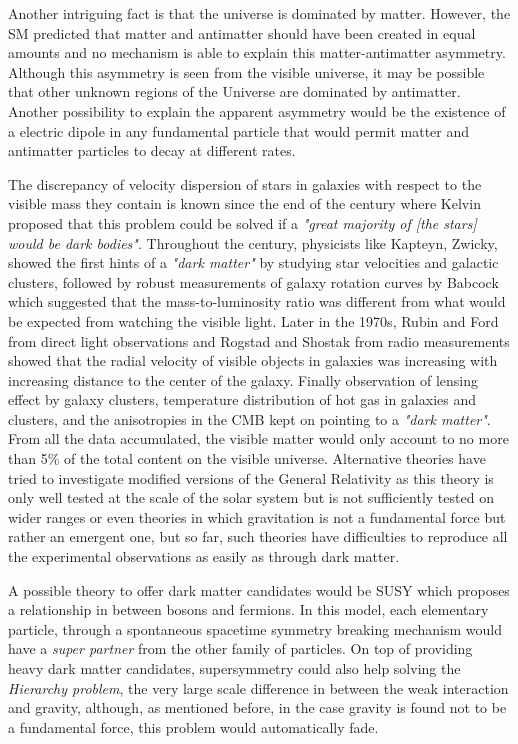 	Another intriguing fact is that the universe is dominated by matter. However, the SM predicted that matter and antimatter should have been created in equal amounts and no mechanism is able to explain this matter-antimatter asymmetry. Although this asymmetry is seen from the visible universe, it may be possible that other unknown regions of the Universe are dominated by antimatter. Another possibility to explain the apparent asymmetry would be the existence of a electric dipole in any fundamental particle that would permit matter and antimatter particles to decay at different rates.
	
	The discrepancy of velocity dispersion of stars in galaxies with respect to the visible mass they contain is known since the end of the  century where Kelvin proposed that this problem could be solved if a \textit{"great majority of [the stars] would be dark bodies"}. Throughout the  century, physicists like Kapteyn, Zwicky, showed the first hints of a \textit{"dark matter"} by studying star velocities and galactic clusters, followed by robust measurements of galaxy rotation curves by Babcock which suggested that the mass-to-luminosity ratio was different from what would be expected from watching the visible light. Later in the 1970s, Rubin and Ford from direct light observations and Rogstad and Shostak from radio measurements showed that the radial velocity of visible objects in galaxies was increasing with increasing distance to the center of the galaxy. Finally observation of lensing effect by galaxy clusters, temperature distribution of hot gas in galaxies and clusters, and the anisotropies in the \acf{CMB} kept on pointing to a \textit{"dark matter"}. From all the data accumulated, the visible matter would only account to no more than 5\% of the total content on the visible universe. Alternative theories have tried to investigate modified versions of the General Relativity as this theory is only well tested at the scale of the solar system but is not sufficiently tested on wider ranges or even theories in which gravitation is not a fundamental force but rather an emergent one, but so far, such theories have difficulties to reproduce all the experimental observations as easily as through dark matter.
	
	A possible theory to offer dark matter candidates would be \acf{SUSY} which proposes a relationship in between bosons and fermions. In this model, each elementary particle, through a spontaneous spacetime symmetry breaking mechanism would have a \textit{super partner} from the other family of particles. On top of providing heavy dark matter candidates, supersymmetry could also help solving the \textit{Hierarchy problem}, the very large scale difference in between the weak interaction and gravity, although, as mentioned before, in the case gravity is found not to be a fundamental force, this problem would automatically fade.\\
	
